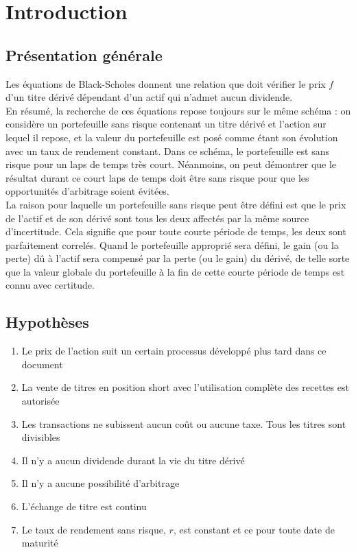\section{Introduction}
\subsection{Présentation générale}
Les équations de Black-Scholes donnent une relation que doit vérifier le prix $f$ d'un titre dérivé dépendant d'un actif qui n'admet aucun dividende.\\
En résumé, la recherche de ces équations repose toujours sur le même schéma : on considère un portefeuille sans risque contenant un titre dérivé et l'action sur lequel il repose, et la valeur du portefeuille est posé comme étant son évolution avec un taux de rendement constant. 
Dans ce schéma, le portefeuille est sans risque pour un laps de temps très court. Néanmoins, on peut démontrer que le résultat durant ce court laps de temps doit être sans risque pour que les opportunités d'arbitrage soient évitées.\\
La raison pour laquelle un portefeuille sans risque peut être défini est que le prix de l'actif et de son dérivé sont tous les deux affectés par la même source d'incertitude. Cela signifie que pour toute courte période de temps, les deux sont parfaitement correlés. Quand le portefeuille approprié sera défini, le gain (ou la perte) dû à l'actif sera compensé par la perte (ou le gain) du dérivé, de telle sorte que la valeur globale du portefeuille à la fin de cette courte période de temps est connu avec certitude.

\subsection{Hypothèses}
\begin{enumerate}
	\item Le prix de l'action suit un certain processus développé plus tard dans ce document
	\item La vente de titres en position short avec l'utilisation complète des recettes est autorisée
	\item Les transactions ne subissent aucun coût ou aucune taxe. Tous les titres sont divisibles
	\item Il n'y a aucun dividende durant la vie du titre dérivé
	\item Il n'y a aucune possibilité d'arbitrage
	\item L'échange de titre est continu
	\item Le taux de rendement sans risque, $r$, est constant et ce pour toute date de maturité
\end{enumerate}

